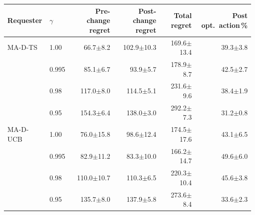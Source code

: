 \begin{tabular}{llrrrr}
\toprule
Requester & $\gamma$ & Pre-change regret & Post-change regret & Total regret & Post opt.\ action\,\% \\
\midrule
MA-D-TS & 1.00 & 66.7{\scriptsize$\pm$8.2} & 102.9{\scriptsize$\pm$10.3} & 169.6{\scriptsize$\pm$13.4} & 39.3{\scriptsize$\pm$3.8} \\
 & 0.995 & 85.1{\scriptsize$\pm$6.7} & 93.9{\scriptsize$\pm$5.7} & 178.9{\scriptsize$\pm$8.7} & 42.5{\scriptsize$\pm$2.7} \\
 & 0.98 & 117.0{\scriptsize$\pm$8.0} & 114.5{\scriptsize$\pm$5.1} & 231.6{\scriptsize$\pm$9.6} & 38.4{\scriptsize$\pm$1.9} \\
 & 0.95 & 154.3{\scriptsize$\pm$6.4} & 138.0{\scriptsize$\pm$3.0} & 292.2{\scriptsize$\pm$7.3} & 31.2{\scriptsize$\pm$0.8} \\
\midrule
MA-D-UCB & 1.00 & 76.0{\scriptsize$\pm$15.8} & 98.6{\scriptsize$\pm$12.4} & 174.5{\scriptsize$\pm$17.6} & 43.1{\scriptsize$\pm$6.5} \\
 & 0.995 & 82.9{\scriptsize$\pm$11.2} & 83.3{\scriptsize$\pm$10.0} & 166.2{\scriptsize$\pm$14.7} & 49.6{\scriptsize$\pm$6.0} \\
 & 0.98 & 110.0{\scriptsize$\pm$10.7} & 110.3{\scriptsize$\pm$6.5} & 220.3{\scriptsize$\pm$10.4} & 45.6{\scriptsize$\pm$3.8} \\
 & 0.95 & 135.7{\scriptsize$\pm$8.0} & 137.9{\scriptsize$\pm$5.8} & 273.6{\scriptsize$\pm$8.4} & 33.6{\scriptsize$\pm$2.3} \\
\bottomrule
\end{tabular}
